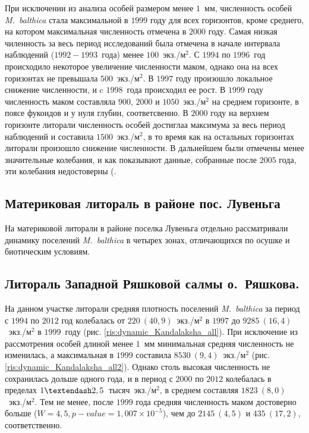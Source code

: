 \documentclass[12pt, a4paper]{disser}
\begin{document}
При исключении из анализа особей размером менее $1$~мм, численность особей {\it M.~balthica} стала максимальной в $1999$ году для всех горизонтов, кроме среднего, на котором максимальная численность отмечена в $2000$ году.
Самая низкая чиленность за весь период исследований была отмечена в начале интервала наблюдений ($1992-1993$~года) \emdash менее $100$~экз./м$^2$.
С $1994$ по $1996$~год происходило некоторое увеличение численности маком, однако она на всех горизонтах не превышала $500$~экз./м$^2$.
В $1997$ году произошло локальное снижение численности, и c $1998$~года происходил ее рост. 
В $1999$ году численность маком составляла $900$, $2000$ и $1050$~экз./м$^2$ на среднем горизонте, в поясе фукоидов и у нуля глубин, соответсвенно.
В $2000$ году на верхнем горизонте литорали численность особей достиглаа максимума за весь период наблюдений и составила  $1500$~экз./м$^2$, в то время как на остальных горизонтах литорали произошло снижение численности.
В дальнейшем были отмечены менее значительные колебания, и как показывают данные, собранные после $2005$ года, эти колебания недостоверны (.


		\subsection{Материковая литораль в районе пос. Лувеньга}

На материковой литорали в районе поселка Лувеньга отдельно рассматривали динамику поселений {\it M.~balthica} в четырех зонах, отличающихся по осушке и биотическим условиям.



		\subsection{Литораль Западной Ряшковой салмы о.~Ряшкова.}

На данном участке литорали средняя плотность поселений {\it M.~balthica} за период с $1994$ по $2012$ год колебалась от $220~(40,9)$~экз./м$^2$ в $1997$ до $9285~(16,4)$~экз./м$^2$ в $1999$~году (рис. \ref{ris:dynamic_Kandalaksha_all}).
При исключение из рассмотрения особей длиной менее $1$~мм минимальная средняя численность не изменилась, а максимальная в $1999$ составила $8530~(9,4)$~экз./м$^2$ (рис. \ref{ris:dynamic_Kandalaksha_all2}).
Однако столь высокая численность не сохранилась дольше одного года, и в период с $2000$ по $2012$ колебалась в пределах $1 \textendash 2,5$~тысяч~экз./м$^2$, в среднем составляя $1823~(8,0)$~экз./м$^2$.
Тем не менее, после $1999$ года средняя численность маком достоверно больше ($W = 4,5, p-value = 1,007 \times 10^{-5}$), чем до \textemdash $2145~(4,5)$ и $435~(17,2)$, соответственно.
\end{document}

